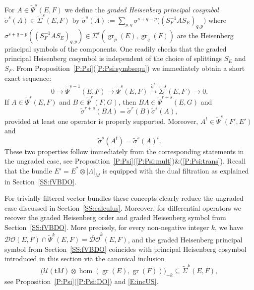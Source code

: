 \documentclass[reqno,12pt]{amsart}
\DeclareMathOperator{\gr}{gr}
\newcommand{\DO}{\mathcal D\mathcal O}
\newcommand\itemref[1]{(\ref{#1})}
\theoremstyle{plain}
\theoremstyle{definition}
\begin{document}
For $A\in\tilde\Psi^s(E,F)$ we define the \emph{graded Heisenberg principal cosymbol} $\tilde\sigma^s(A)\in\tilde\Sigma^s(E,F)$ by $\tilde\sigma^s(A):=\sum_{p,q}\sigma^{s+q-p}\bigl((S_F^{-1}AS_E)_{q,p}\bigr)$ where $\sigma^{s+q-p}((S_F^{-1}AS_E)_{q,p})\in\Sigma^s(\gr_p(E),\gr_q(F))$ are the Heisenberg principal symbols of the components.
One readily checks that the graded principal Heisenberg cosymbol is independent of the choice of splittings $S_E$ and $S_F$.
From Proposition~\ref{P:Psi}\itemref{P:Psi:symbsequ} we immediately obtain a short exact sequence:
$$
0\to\tilde\Psi^{s-1}(E,F)\to\tilde\Psi^s(E,F)\xrightarrow{\tilde\sigma^s}\tilde\Sigma^s(E,F)\to0.
$$
If $A\in\tilde\Psi^s(E,F)$ and $B\in\tilde\Psi^r(F,G)$, then $BA\in\tilde\Psi^{r+s}(E,G)$ and
\begin{equation}\label{E:grsigmaAB}
\tilde\sigma^{r+s}(BA)=\tilde\sigma^r(B)\tilde\sigma^s(A),
\end{equation}
provided at least one operator is properly supported.
Moreover, $A^t\in\tilde\Psi^s(F',E')$ and
\begin{equation}\label{E:grsigmaAt}
\tilde\sigma^s(A^t)=\tilde\sigma^s(A)^t.
\end{equation}
These two properties follow immediately from the corresponding statements in the ungraded case, see Proposition~\ref{P:Psi}\itemref{P:Psi:mult}\&\itemref{P:Psi:trans}.
Recall that the bundle $E'=E^*\otimes|\Lambda|_{M}$ is equipped with the dual filtration as explained in Section~\ref{SS:fVBDO}.


For trivially filtered vector bundles these concepts clearly reduce the ungraded case discussed in Section~\ref{SS:calculus}.
Moreover, for differential operators we recover the graded Heisenberg order and graded Heisenberg symbol from Section~\ref{SS:fVBDO}.
More precisely, for every non-negative integer $k$, we have $\DO(E,F)\cap\tilde\Psi^k(E,F)=\widetilde{\DO}^k(E,F)$, and the graded Heisenberg principal symbol from Section~\ref{SS:fVBDO} coincides with principal Heisenberg cosymbol introduced in this section via the canonical inclusion
\begin{equation}\label{E:incUSgr}
\bigl(\mathcal U(\mathfrak tM)\otimes\hom(\gr(E),\gr(F))\bigr)_{-k}\subseteq\tilde\Sigma^k(E,F),
\end{equation}
see Proposition~\ref{P:Psi}\itemref{P:Psi:DO} and \eqref{E:incUS}.
\end{document}
